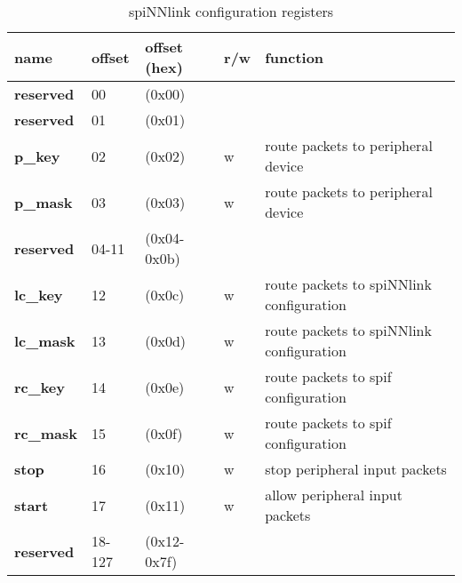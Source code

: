 \documentclass[11pt,a4paper,twoside]{article}
\begin{document}
\begin{center}
	\begin{table}[!h]
		\begin{tabularx}{\textwidth}{| p{30mm} p{13mm} p{21mm} p{7mm} X |}
			\hline
			\textbf{name}                        & \textbf{offset}           & \textbf{offset} (hex)           & \textbf{r/w}        & \textbf{function} \\%
			\hline
			\hline
			\cellcolor{gray!25}\textbf{reserved} & \cellcolor{gray!25}00     & \cellcolor{gray!25}(0x00)       & \cellcolor{gray!25} & \cellcolor{gray!25}\\%
			\cellcolor{gray!25}\textbf{reserved} & \cellcolor{gray!25}01     & \cellcolor{gray!25}(0x01)       & \cellcolor{gray!25} & \cellcolor{gray!25}\\%
			\textbf{p\_key}                      & 02                        & (0x02)                          & w                   & route packets to peripheral device             \\%
			\textbf{p\_mask}                     & 03                        & (0x03)                          & w                   & route packets to peripheral device             \\%
			\cellcolor{gray!25}\textbf{reserved} & \cellcolor{gray!25}04-11  & \cellcolor{gray!25} (0x04-0x0b) & \cellcolor{gray!25} & \cellcolor{gray!25}\\%
			\textbf{lc\_key}                     & 12                        & (0x0c)                          & w                   & \small{route packets to spiNNlink configuration} \\%
			\textbf{lc\_mask}                    & 13                        & (0x0d)                          & w                   & \small{route packets to spiNNlink configuration} \\%
			\textbf{rc\_key}                     & 14                        & (0x0e)                          & w                   & route packets to spif configuration   \\%
			\textbf{rc\_mask}                    & 15                        & (0x0f)                          & w                   & route packets to spif configuration   \\%
			\textbf{stop}                        & 16                        & (0x10)                          & w                   & stop peripheral input packets         \\%
			\textbf{start}                       & 17                        & (0x11)                          & w                   & allow peripheral input packets         \\%
			\cellcolor{gray!25}\textbf{reserved} & \cellcolor{gray!25}18-127 & \cellcolor{gray!25} (0x12-0x7f) & \cellcolor{gray!25} & \cellcolor{gray!25}\\%
			\hline
		\end{tabularx}
		\caption{spiNNlink configuration registers}
		\label{tab:spin_regs}
	\end{table}
\end{center}
\end{document}
